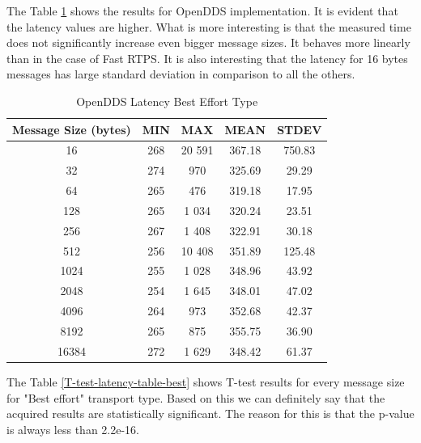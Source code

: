 \documentclass{csfourzero}
\begin{document}
The Table \ref{openDDS-latency-table-best} shows the results for OpenDDS implementation. It is evident that the latency values are higher. What is more interesting is that the measured time does not significantly increase even bigger message sizes. It behaves more linearly than in the case of Fast RTPS. It is also interesting that the latency for 16 bytes messages has large standard deviation in comparison to all the others.

\begin{table}[!ht]
	\centering
	\caption{OpenDDS Latency Best Effort Type}
	\label{openDDS-latency-table-best}
	\begin{tabular}{|c|c|c|c|c|}
		\hline 
		Message Size (bytes)& MIN & MAX & MEAN & STDEV \\ 
		\hline 
		16 & 268 & 20 591 & 367.18 & 750.83 \\ 
		\hline 
		32 & 274 & 970 & 325.69 & 29.29 \\ 
		\hline 
		64 & 265 & 476 & 319.18 & 17.95 \\ 
		\hline 
		128 & 265 & 1 034 & 320.24 & 23.51 \\ 
		\hline 
		256 & 267 & 1 408 & 322.91 & 30.18 \\ 
		\hline 
		512 & 256 & 10 408 & 351.89 & 125.48 \\ 
		\hline 
		1024 & 255 & 1 028 & 348.96 & 43.92 \\ 
		\hline 
		2048 & 254 & 1 645 & 348.01 & 47.02 \\ 
		\hline 
		4096 & 264 & 973 & 352.68 & 42.37 \\ 
		\hline 
		8192 & 265 & 875 & 355.75 & 36.90 \\ 
		\hline 
		16384 & 272 & 1 629 & 348.42 & 61.37 \\ 
		\hline 
	\end{tabular}
\end{table}

The Table \ref{T-test-latency-table-best} shows T-test results for every message size for "Best effort" transport type. Based on this we can definitely say that the acquired results are statistically significant. The reason for this is that the p-value is always less than 2.2e-16.
\end{document}
